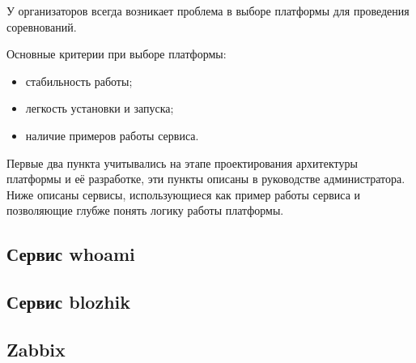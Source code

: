 У организаторов всегда возникает проблема в выборе платформы для проведения соревнований.

Основные критерии при выборе платформы:
\begin{itemize}
\item стабильность работы;
\item легкость установки и запуска;
\item наличие примеров работы сервиса.
\end{itemize}

Первые два пункта учитывались на этапе проектирования архитектуры платформы и её разработке, эти пункты описаны в руководстве администратора.
Ниже описаны сервисы, использующиеся как пример работы сервиса и позволяющие глубже понять логику работы платформы.

\subsection{Сервис whoami}


\subsection{Сервис blozhik}


\subsection{Zabbix}
